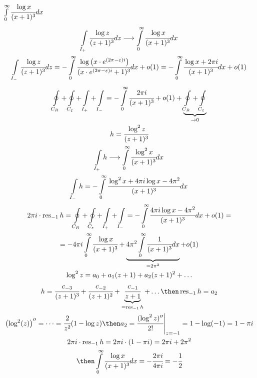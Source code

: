 \begin{exmpl}
    $\int\limits_{0}^{\infty}\cfrac{\log x}{(x + 1)^3}dx$
    \begin{gather*}
        \int\limits_{I_+}\cfrac{\log z}{(z + 1)^3}dz \longrightarrow \int\limits_0^{\infty}\cfrac{\log x}{(x + 1)^3}dx \\ 
        \int\limits_{I_-}\cfrac{\log z}{(z + 1)^3}dz = -\int\limits_0^{\infty}\cfrac{\log \left( x \cdot e^{(2\pi - \varepsilon)i} \right)}{(x \cdot e^{(2\pi - \varepsilon)i}+ 1)^3}dx + o(1) = -\int\limits_0^{\infty}\cfrac{\log x + 2\pi i}{(x + 1)^3}dx + o(1) \\ 
    \end{gather*}
    \begin{gather*}
        \oint\limits_{C_R} + \oint\limits_{C_{\varepsilon}} + \int\limits_{I_+} + \int\limits_{I_-} = -\int\limits_0^{\infty}\cfrac{2 \pi i}{(x + 1)^3} + o(1) + \underbrace{\oint\limits_{C_R} + \oint\limits_{C_{\varepsilon}}}_{\to 0} \\ 
        \begin{gathered}
            h = \cfrac{\log^2 z}{(z + 1)^3} \\
            \int\limits_{I_+}h \longrightarrow \int\limits_0^{\infty}\cfrac{\log^2 x}{(x + 1)^3}dx \\ 
            \int\limits_{I_-}h = -\int\limits_0^{\infty}\cfrac{\log^2 x + 4\pi i \log x - 4\pi^2}{(x + 1)^3}dx
        \end{gathered}\\
        2\pi i \cdot \operatorname{res}_{-1}h = \oint\limits_{C_R} + \oint\limits_{C_{\varepsilon}} + \int\limits_{I_+} + \int\limits_{I_-} = -\int\limits_0^{\infty}\cfrac{4\pi i \log x - 4\pi^2}{(x + 1)^3}dx + o(1) = \\ 
        = -4\pi i \int\limits_0^{\infty}\cfrac{\log x}{(x + 1)^3} + \underbrace{4\pi^2\int\limits_0^{\infty}\cfrac{1}{(x + 1)^3}dx}_{= 2\pi^2} + o(1) \\ 
        \log^2z  = a_0 + a_1(z + 1) + a_2(z + 1)^2 + \dots \\ 
        h = \cfrac{c_{-3}}{(z + 1)^3} + \cfrac{c_{-2}}{(z + 1)^2} + \underbrace{\cfrac{c_{-1}}{z + 1}}_{= \operatorname{res}_{-1}h} + \dots \then \operatorname{res}_{-1}h = a_2 \\ 
        \left( \log^2(z) \right)'' = \dots = \cfrac{2}{z^2}(1 - \log z) \then a_2 = \cfrac{(\log^2 z)''}{2!} \Bigg|_{z = -1} = 1 - \log(-1) = 1 - \pi i \\ 
        2\pi i \cdot \operatorname{res}_{-1} h = 2 \pi i \cdot (1 - \pi i) = 2 \pi i + 2 \pi^2 \\ 
        \then \int\limits_0^{\infty}\cfrac{\log x}{(x + 1)^3} dx = -\cfrac{2\pi i}{4 \pi i} = -\cfrac{1}{2}
    \end{gather*}
\end{exmpl}
